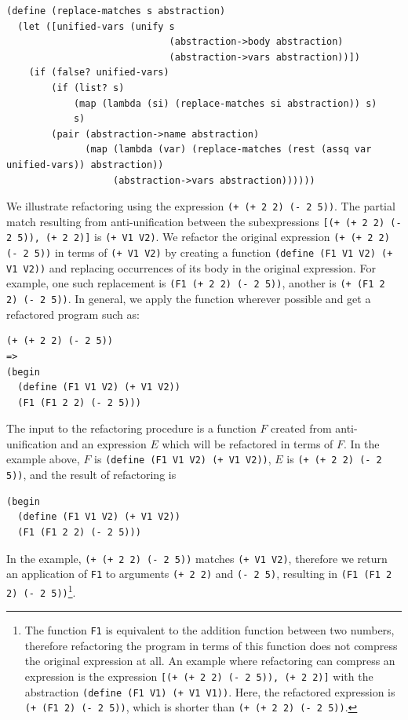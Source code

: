 \documentclass[a4paper,10pt]{article}
\begin{document}
\begin{lstlisting}[frame=trbl]
(define (replace-matches s abstraction)
  (let ([unified-vars (unify s
                             (abstraction->body abstraction)
                             (abstraction->vars abstraction))])
    (if (false? unified-vars)
        (if (list? s)
            (map (lambda (si) (replace-matches si abstraction)) s)
            s)
        (pair (abstraction->name abstraction)
              (map (lambda (var) (replace-matches (rest (assq var unified-vars)) abstraction))
                   (abstraction->vars abstraction))))))
\end{lstlisting}
We illustrate refactoring using the expression \texttt{(+ (+ 2 2) (- 2 5))}. The partial match resulting from anti-unification between the subexpressions \texttt{[(+ (+ 2 2) (- 2 5)), (+ 2 2)]} is \texttt{(+ V1 V2)}.  We refactor the original expression \texttt{(+ (+ 2 2) (- 2 5))} in terms of \texttt{(+ V1 V2)} by creating a function \texttt{(define (F1 V1 V2) (+ V1 V2))} and replacing occurrences of its body in the original expression.  For example, one such replacement is \texttt{(F1 (+ 2 2) (- 2 5))}, another is \texttt{(+ (F1 2 2) (- 2 5))}.  In general, we apply the function wherever possible and get a refactored program such as:
\begin{lstlisting}
(+ (+ 2 2) (- 2 5))
=>
(begin
  (define (F1 V1 V2) (+ V1 V2))
  (F1 (F1 2 2) (- 2 5)))
\end{lstlisting}
The input to the refactoring procedure is a function $F$ created from anti-unification and an expression $E$ which will be refactored in terms of $F$.  In the example above, $F$ is \texttt{(define (F1 V1 V2) (+ V1 V2))}, $E$ is \texttt{(+ (+ 2 2) (- 2 5))}, and the result of refactoring is
\begin{lstlisting}
(begin
  (define (F1 V1 V2) (+ V1 V2))
  (F1 (F1 2 2) (- 2 5)))
\end{lstlisting}

In the example, \texttt{(+ (+ 2 2) (- 2 5))} matches \texttt{(+ V1 V2)}, therefore we return an application of \texttt{F1} to arguments \texttt{(+ 2 2)} and \texttt{(- 2 5)}, resulting in \texttt{(F1 (F1 2 2) (- 2 5))}\footnote{The function \texttt{F1} is equivalent to the addition function between two numbers, therefore refactoring the program in terms of this function does not compress the original expression at all.  An example where refactoring can compress an expression is the expression \texttt{[(+ (+ 2 2) (- 2 5)), (+ 2 2)]} with the abstraction \texttt{(define (F1 V1) (+ V1 V1))}. Here, the refactored expression is \texttt{(+ (F1 2) (- 2 5))}, which is shorter than \texttt{(+ (+ 2 2) (- 2 5))}.}.  
\end{document}
